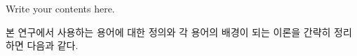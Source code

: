 \setcounter{page}{1}

\label{subsec:intro}
Write your contents here.

본 연구에서 사용하는 용어에 대한 정의와 각 용어의 배경이 되는 이론을 간략히 정리하면 다음과 같다.
